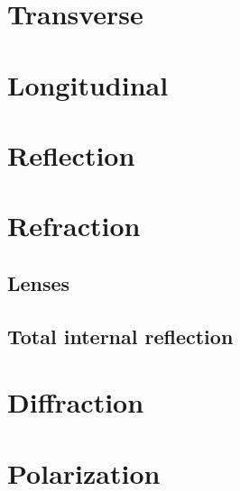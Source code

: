 \documentclass{book}
\begin{document}
\section{Transverse}


\section{Longitudinal}


\section{Reflection}


\section{Refraction}
\subsection{Lenses}

\subsection{Total internal reflection}


\section{Diffraction}


\section{Polarization}
\end{document}
